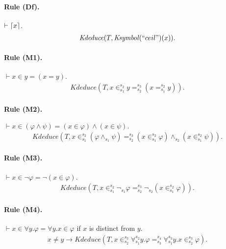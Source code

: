 \documentclass[UTF8,11pt]{article}
\theoremstyle{plain}
\theoremstyle{definition}
\theoremstyle{remark}
\DeclarePairedDelimiter{\ceil}{\lceil}{\rceil}
\newcommand{\Ksymbol}{\mathit{Ksymbol}}
\newcommand{\kand}{\wedge}
\newcommand{\knot}{\neg}
\newcommand{\kforall}{\forall}
\newcommand{\kequals}{=}
\newcommand{\kin}{\in}
\newcommand{\Kdeduce}{\mathit{Kdeduce}}
\begin{document}
\paragraph{Rule (Df).}
$\vdash \ceil{x}$.
\begin{align*}
\Kdeduce(T, \Ksymbol(``ceil")(x)).
\end{align*}

\paragraph{Rule (M1).}
$\vdash x \in y = (x = y)$.
\begin{align*}
\Kdeduce(T, x \kin_{s_1}^{s_2} y \kequals_{s_2}^{s_3} (x \kequals_{s_1}^{s_2} 
y)).
\end{align*}

\paragraph{Rule (M2).}
$\vdash x \in (\varphi \wedge \psi) = (x \in \varphi) \wedge (x \in \psi).$
\begin{align*}
\Kdeduce(T, x \kin_{s_1}^{s_2} (\varphi \kand_{s_1} \psi) \kequals_{s_2}^{s_3} 
(x 
\kin_{s_1}^{s_2} \varphi) \kand_{s_2} (x \kin_{s_1}^{s_2} \psi)).
\end{align*}

\paragraph{Rule (M3).}
$\vdash x \in \neg \varphi = \neg (x \in \varphi)$.
\begin{align*}
\Kdeduce(T, x \kin_{s_1}^{s_2} \knot_{s_1} \varphi \kequals_{s_2}^{s_3} 
\knot_{s_2} 
(x 
\kin_{s_1}^{s_2} \varphi)).
\end{align*}

\paragraph{Rule (M4).}
$\vdash x \in \forall y . \varphi = \forall y . x \in \varphi$ if $x$ is distinct from $y$.
\begin{align*}
x \neq y \to \Kdeduce(T, x \kin_{s_2}^{s_3} \kforall_{s_1}^{s_2} y . \varphi 
\kequals_{s_3}^{s_4} \kforall_{s_1}^{s_3} y . x \kin_{s_2}^{s_3} \varphi).
\end{align*}
\end{document}
